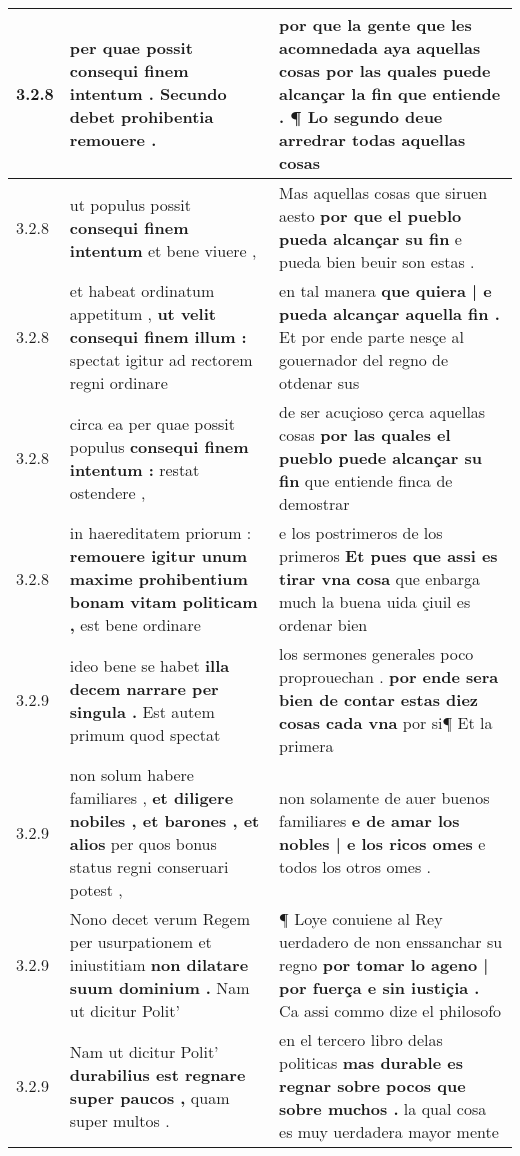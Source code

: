 \begin{tabular}{|p{1cm}|p{6.5cm}|p{6.5cm}|}
3.2.8 & per quae possit \textbf{ consequi finem intentum . } Secundo debet prohibentia remouere . & por que la gente que les acomnedada aya aquellas cosas \textbf{ por las quales puede alcançar la fin que entiende . } ¶ Lo segundo deue arredrar todas aquellas cosas \\\hline
3.2.8 & ut populus possit \textbf{ consequi finem intentum } et bene viuere , & Mas aquellas cosas que siruen aesto \textbf{ por que el pueblo pueda alcançar su fin } e pueda bien beuir son estas . \\\hline
3.2.8 & et habeat ordinatum appetitum , \textbf{ ut velit consequi finem illum : } spectat igitur ad rectorem regni ordinare & en tal manera \textbf{ que quiera | e pueda alcançar aquella fin . } Et por ende parte nesçe al gouernador del regno de otdenar sus \\\hline
3.2.8 & circa ea per quae possit populus \textbf{ consequi finem intentum : } restat ostendere , & de ser acuçioso çerca aquellas cosas \textbf{ por las quales el pueblo puede alcançar su fin } que entiende finca de demostrar \\\hline
3.2.8 & in haereditatem priorum : \textbf{ remouere igitur unum maxime prohibentium bonam vitam politicam , } est bene ordinare & e los postrimeros de los primeros \textbf{ Et pues que assi es tirar vna cosa } que enbarga much la buena uida çiuil es ordenar bien \\\hline
3.2.9 & ideo bene se habet \textbf{ illa decem narrare per singula . } Est autem primum quod spectat & los sermones generales poco proprouechan . \textbf{ por ende sera bien de contar estas diez cosas cada vna } por si¶ Et la primera \\\hline
3.2.9 & non solum habere familiares , \textbf{ et diligere nobiles , et barones , et alios } per quos bonus status regni conseruari potest , & non solamente de auer buenos familiares \textbf{ e de amar los nobles | e los ricos omes } e todos los otros omes . \\\hline
3.2.9 & Nono decet verum Regem per usurpationem et iniustitiam \textbf{ non dilatare suum dominium . } Nam ut dicitur Polit’ & ¶ Loye conuiene al Rey uerdadero de non enssanchar su regno \textbf{ por tomar lo ageno | por fuerça e sin iustiçia . } Ca assi commo dize el philosofo \\\hline
3.2.9 & Nam ut dicitur Polit’ \textbf{ durabilius est regnare super paucos , } quam super multos . & en el tercero libro delas politicas \textbf{ mas durable es regnar sobre pocos que sobre muchos . } la qual cosa es muy uerdadera mayor mente \\\hline

\end{tabular}

